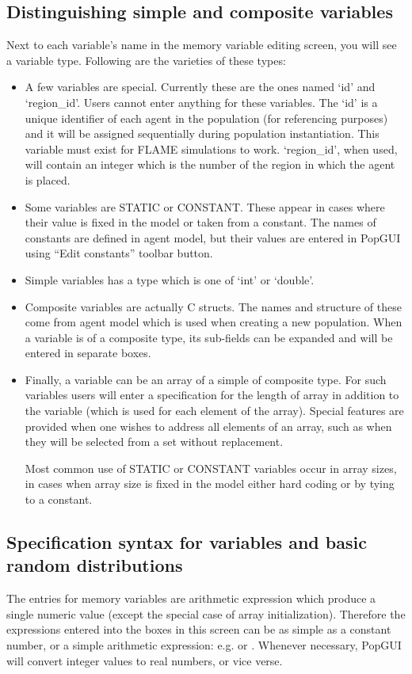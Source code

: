 \subsection{Distinguishing simple and composite variables}
Next to each variable's name in the memory variable editing screen, you will see a variable type. Following are the varieties of these types:
\begin{itemize}
  \item A few variables are special. Currently these are the ones named `id' and `region\_id'. Users cannot enter anything for these variables. The `id' is a unique identifier of each agent in the population (for referencing purposes) and it will be assigned sequentially during population instantiation. This variable must exist for FLAME simulations to work. `region\_id', when used, will contain an integer which is the number of the region in which the agent is placed.
  \item Some variables are STATIC or CONSTANT. These appear in cases where their value is fixed in the model or taken from a constant. The names of constants are defined in agent model, but their values are entered in PopGUI using ``Edit constants'' toolbar button.
  \item Simple variables has a type which is one of `int' or `double'.
  \item Composite variables are actually C structs. The names and structure of these come from agent model which is used when creating a new population. When a variable is of a composite type, its sub-fields can be expanded and will be entered in separate boxes.
  \item Finally, a variable can be an array of a simple of composite type. For such variables users will enter a specification for the length of array in addition to the variable (which is used for each element of the array). Special features are provided when one wishes to address all elements of an array, such as when they will be selected from a set without replacement.

Most common use of STATIC or CONSTANT variables occur in array sizes, in cases when array size is fixed in the model either hard coding or by tying to a constant.
\end{itemize}

\subsection{Specification syntax for variables and basic random distributions}
The entries for memory variables are arithmetic expression which produce a single numeric value (except the special case of array initialization). Therefore the expressions entered into the boxes in this screen can be as simple as a constant number, or a simple arithmetic expression: e.g.  or . Whenever necessary, PopGUI will convert integer values to real numbers, or vice verse.


